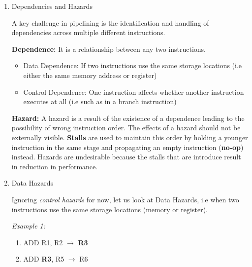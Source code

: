 \documentclass[12pt]{article}
\newenvironment{QandA}{\begin{enumerate}[label=\bfseries\arabic*.]\bfseries}
                      {\end{enumerate}}
\newenvironment{answered}{\par\quad\normalfont}{}
\begin{document}
\begin{QandA}
\begin{answered}
    Therefore longer (deeper) pipelines show diminishing clock frequency gains. However, in our example, we can assume that our clock period = \textbf{10ns} + overheads = \textbf{12ns}. And let's say that our CPI = 1 + pipeline penalty = \textbf{1.5}. Our effective performance will then be \textbf{12ns $\times$ 1.5 = 18ns/insn}.
    \end{answered}
    
    \item Dependencies and Hazards
    \begin{answered}
    A key challenge in pipelining is the identification and handling of dependencies across multiple different instructions.
    
    \textbf{Dependence:} It is a relationship between any two instructions.
    
    \begin{itemize}
        \item Data Dependence: If two instructions use the same storage locations (i.e either the same memory address or register)
        \item Control Dependence: One instruction affects whether another instruction executes at all (i.e such as in a branch instruction)
    \end{itemize}
    
    \textbf{Hazard:} A hazard is a result of the existence of a dependence leading to the possibility of wrong instruction order. The effects of a hazard should not be externally visible. \textbf{Stalls} are used to maintain this order by holding a younger instruction in the same stage and propagating an empty instruction (\textbf{no-op}) instead. Hazards are undesirable because the stalls that are introduce result in reduction in performance.
    \end{answered}
    
    \item Data Hazards
    \begin{answered}
    Ignoring \textit{control hazards} for now, let us look at Data Hazards, i.e when two instructions use the same storage locations (memory or register). 
    
    \textit{Example 1:}
    \begin{enumerate}
        \item ADD R1, R2 $\rightarrow$ \textbf{R3}
        \item ADD \textbf{R3}, R5 $\rightarrow$ R6
    \end{enumerate}
    

\end{answered}
\end{QandA}
\end{document}
